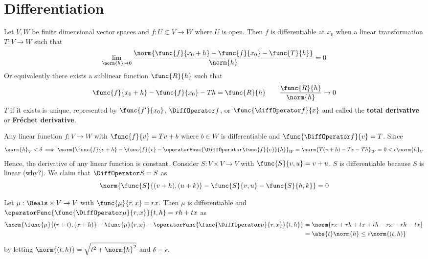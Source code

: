 \chapter{Differentiation}
Let \(V,W\) be finite dimensional vector spaces and \(f: U \subset V \to W\) where \(U\) is open. Then \(f\) is differentiable at \(x_0\) when a linear transformation \(T : V \to W\) such that
\begin{equation*}
    \lim_{\norm{h} \to 0} \dfrac{\norm{\func{f}{x_0 + h} - \func{f}{x_0} - \func{T}{h}}}{\norm{h}}= 0
\end{equation*}
Or equivalently there exists a sublinear function \(\func{R}{h}\) such that
\begin{equation*}
    \func{f}{x_0 + h} - \func{f}{x_0} - Th = \func{R}{h} \qquad \frac{\func{R}{h}}{\norm{h}} \to 0
\end{equation*}
\(T\) if it exists is unique, represented by \(\func{f'}{x_0}\), \(\DiffOperator f\), or \(\func{\diffOperator f}{x}\) and called the \textbf{total derivative} or \textbf{Fr\'{e}chet derivative}.

\begin{example}
    Any linear function \(f : V \to W\) with \(\func{f}{v} = Tv + b\) where \(b \in W\) is differentiable and \(\func{\DiffOperator f}{v} = T\). Since
    \begin{equation*}
        \norm{h}_V < \delta \implies \norm{\func{f}{v + h} - \func{f}{v} - \operatorFunc{\DiffOperator \func{f}{v}}{h}}_W = \norm{T(v+h) - Tv - Th}_W = 0 < \epsilon \norm{h}_V
    \end{equation*}
    Hence, the derivative of any linear function is constant.
    Consider \(S : V \times V \to V\) with \(\func{S}{v,u} = v + u\). \(S\) is differentiable because \(S\) is linear (why?). We claim that \(\DiffOperator S = S\) as
    \begin{equation*}
        \norm{\func{S}{(v + h),(u + k)} - \func{S}{v,u} - \func{S}{h,k}} = 0
    \end{equation*}
\end{example}

\begin{example}
    Let \(\mu : \Reals \times V \to V\) with \(\func{\mu}{r,x} = rx\). Then \(\mu\) is differentiable and \(\operatorFunc{\func{\DiffOperator \mu}{r,x}}{t,h} = rh + tx\) as
    \begin{align*}
        \norm{\func{\mu}{(r + t),(x + h)} - \func{\mu}{r,x} - \operatorFunc{\func{\DiffOperator \mu}{r,x}}{t,h}} & = \norm{rx + rh + tx + th - rx - rh - tx}     \\
                                                                                                                 & = \abs{t} \norm{h} \leq \epsilon \norm{(t,h)}
    \end{align*}
    by letting \(\norm{(t,h)} = \sqrt{t^2 + \norm{h}^2}\) and \(\delta = \epsilon\).
\end{example}


